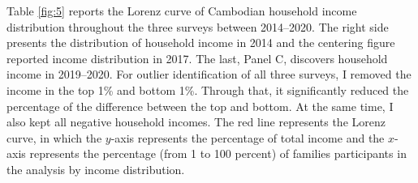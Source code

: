 \documentclass[11pt,letterpaper]{article}
\begin{document}
Table \ref{fig:5} reports the Lorenz curve of Cambodian household income distribution throughout the three surveys between 2014--2020. The right side presents the distribution of household income in 2014 and the centering figure reported income distribution in 2017. The last, Panel C, discovers household income in 2019--2020. For outlier identification of all three surveys, I removed the income in the top 1\% and bottom 1\%. Through that, it significantly reduced the percentage of the difference between the top and bottom. At the same time, I also kept all negative household incomes. The red line represents the Lorenz curve, in which the $y$-axis represents the percentage of total income and the $x$-axis represents the percentage (from 1 to 100 percent) of families participants in the analysis by income distribution. 
\end{document}
